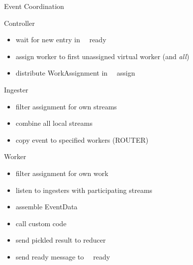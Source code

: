 \documentclass[aspectratio=169]{beamer}
\begin{document}
\begin{frame}{Event Coordination}
\begin{block}{Controller}
\begin{itemize}
 \item wait for new entry in \faDatabase\ \faForward\ ready
 \item assign worker to first unassigned virtual worker (and \emph{all})
 \item distribute WorkAssignment in \faDatabase\ \faForward\ assign
\end{itemize}
\end{block}

\begin{minipage}[t]{0.49\textwidth}
 \begin{block}{Ingester}
  \begin{itemize}
   \item filter assignment for own streams
   \item combine all local streams
   \item copy event to specified workers (ROUTER)
  \end{itemize}

 \end{block}

\end{minipage}
\begin{minipage}[t]{0.49\textwidth}
 \begin{block}{Worker}
  \begin{itemize}
   \item filter assignment for own work
   \item listen to ingesters with participating streams
   \item assemble EventData
   \item call custom code
   \item send pickled result to reducer
   \item send ready message to \faDatabase\ \faForward\ ready
  \end{itemize}

 \end{block}

\end{minipage}

\end{frame}
\end{document}
